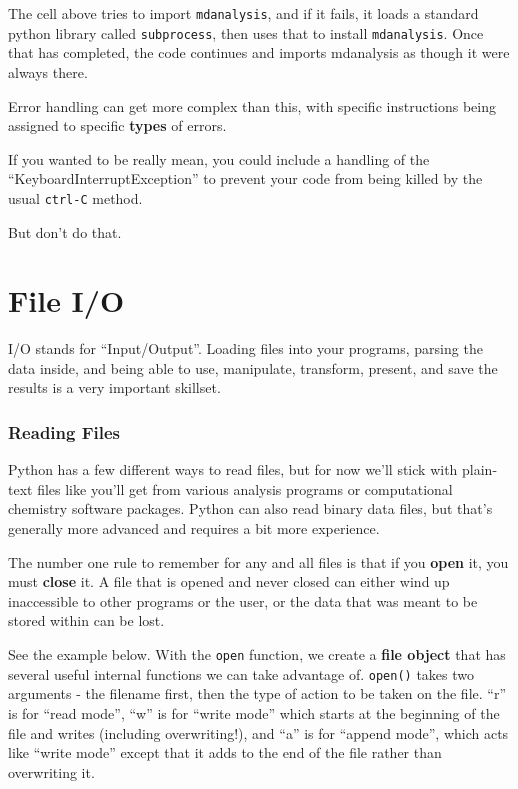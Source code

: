     The cell above tries to import \texttt{mdanalysis}, and if it fails, it
loads a standard python library called \texttt{subprocess}, then uses
that to install \texttt{mdanalysis}. Once that has completed, the code
continues and imports mdanalysis as though it were always there.

Error handling can get more complex than this, with specific
instructions being assigned to specific \textbf{types} of errors.

If you wanted to be really mean, you could include a handling of the
``KeyboardInterruptException'' to prevent your code from being killed by
the usual \texttt{ctrl-C} method.

But don't do that.
\section{File I/O}
I/O stands for ``Input/Output''. Loading files into your programs,
parsing the data inside, and being able to use, manipulate, transform,
present, and save the results is a very important skillset.

    \hypertarget{reading-files}{%
\subsubsection{Reading Files}\label{reading-files}}

Python has a few different ways to read files, but for now we'll stick
with plain-text files like you'll get from various analysis programs or
computational chemistry software packages. Python can also read binary
data files, but that's generally more advanced and requires a bit more
experience.

The number one rule to remember for any and all files is that if you
\textbf{open} it, you must \textbf{close} it. A file that is opened and
never closed can either wind up inaccessible to other programs or the
user, or the data that was meant to be stored within can be lost.

See the example below. With the \texttt{open} function, we create a
\textbf{file object} that has several useful internal functions we can
take advantage of. \texttt{open()} takes two arguments - the filename
first, then the type of action to be taken on the file. ``r'' is for
``read mode'', ``w'' is for ``write mode'' which starts at the beginning
of the file and writes (including overwriting!), and ``a'' is for
``append mode'', which acts like ``write mode'' except that it adds to
the end of the file rather than overwriting it.

